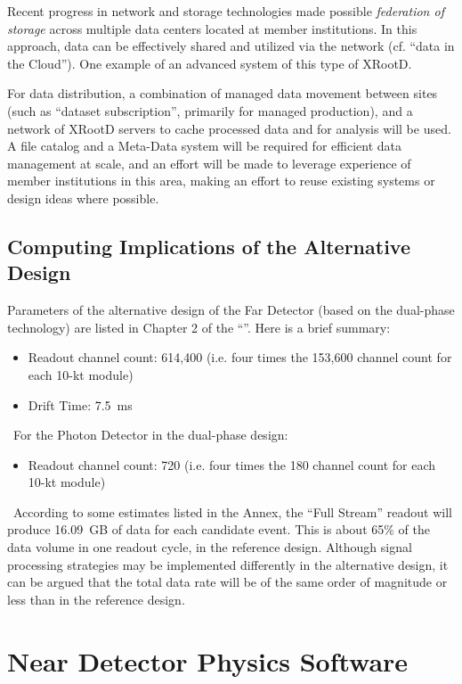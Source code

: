 Recent progress in network and storage technologies made possible
\textit{federation of storage} across multiple data centers located at
member institutions. In this approach, data can be effectively shared
and utilized via the network (cf. ``data in the Cloud''). One example
of an advanced system of this type of XRootD.

For data distribution, a combination of managed data movement between
sites (such as ``dataset subscription'', primarily for managed
production), and a network of XRootD servers to cache processed data
and for analysis will be used.  A file catalog and a Meta-Data system
will be required for efficient data management at scale, and an effort
will be made to leverage experience of member institutions in this
area, making an effort to reuse existing systems or design ideas where
possible.

\subsection{Computing Implications of the Alternative Design}
\label{sec:detectors-sc-alternate}
Parameters of the alternative design of the Far Detector (based on the
dual-phase technology) are listed in Chapter 2 of the
``\anxrates''. Here is a brief summary:
\begin{itemize}
	\item Readout channel count: 614,400 (i.e. four times the
          153,600 channel count for each 10-kt module)
	\item Drift Time: 7.5~ms
\end{itemize}
\
For the Photon Detector in the dual-phase design:
\begin{itemize}
	\item Readout channel count: 720 (i.e. four times the 180
          channel count for each 10-kt module)
\end{itemize}
\ According to some estimates listed in the Annex, the ``Full Stream''
readout will produce 16.09~GB of data for each candidate event. This is
about 65\% of the data volume in one readout cycle, in the reference
design.  Although signal processing strategies may be implemented
differently in the alternative design, it can be argued that the total
data rate will be of the same order of magnitude or less than in the
reference design.

\section{Near Detector Physics Software}
\label{sec:detectors-sc-nd-physics-software}

